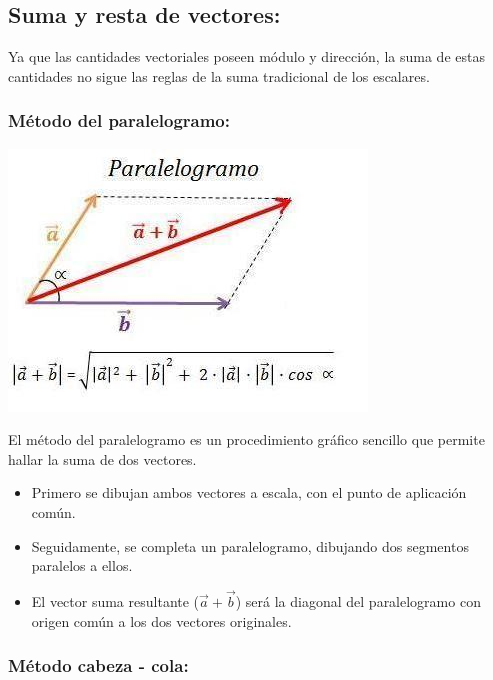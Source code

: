 \subsection{Suma y resta de vectores:}

Ya que las cantidades vectoriales poseen módulo y dirección, la suma de estas cantidades no sigue las reglas de la suma 
tradicional de los escalares.

\subsubsection{Método del paralelogramo:}

\begin{center}
 \includegraphics[scale=0.6]{images/suma-vectores-metodo-paralelogramo.jpg}
\end{center}

El método del paralelogramo es un procedimiento gráfico sencillo que permite hallar la suma de dos vectores.

\begin{itemize}
 \item Primero se dibujan ambos vectores a escala, con el punto de aplicación común.
 \item Seguidamente, se completa un paralelogramo, dibujando dos segmentos paralelos a ellos.
 \item El vector suma resultante ($\vec{a} + \vec{b}$) será la diagonal del paralelogramo con origen común a los dos 
 vectores originales.
\end{itemize}

\subsubsection{Método cabeza - cola:}

